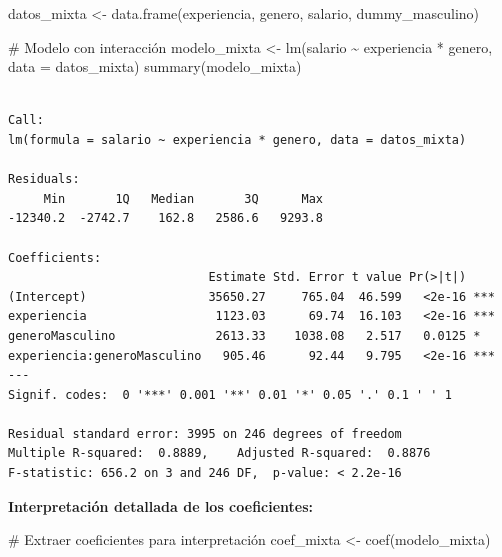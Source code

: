 \documentclass[
  letterpaper,
  DIV=11,
  numbers=noendperiod]{scrreprt}
\newenvironment{Shaded}{\begin{snugshade}}{\end{snugshade}}
\newcommand{\AttributeTok}[1]{\textcolor[rgb]{0.40,0.45,0.13}{#1}}
\newcommand{\CommentTok}[1]{\textcolor[rgb]{0.37,0.37,0.37}{#1}}
\newcommand{\FunctionTok}[1]{\textcolor[rgb]{0.28,0.35,0.67}{#1}}
\newcommand{\NormalTok}[1]{\textcolor[rgb]{0.00,0.23,0.31}{#1}}
\newcommand{\OtherTok}[1]{\textcolor[rgb]{0.00,0.23,0.31}{#1}}
\newcommand{\SpecialCharTok}[1]{\textcolor[rgb]{0.37,0.37,0.37}{#1}}
\begin{document}
\begin{tcolorbox}
\begin{Shaded}
\begin{Highlighting}[]
\NormalTok{datos\_mixta }\OtherTok{\textless{}{-}} \FunctionTok{data.frame}\NormalTok{(experiencia, genero, salario, dummy\_masculino)}

\CommentTok{\# Modelo con interacción}
\NormalTok{modelo\_mixta }\OtherTok{\textless{}{-}} \FunctionTok{lm}\NormalTok{(salario }\SpecialCharTok{\textasciitilde{}}\NormalTok{ experiencia }\SpecialCharTok{*}\NormalTok{ genero, }\AttributeTok{data =}\NormalTok{ datos\_mixta)}
\FunctionTok{summary}\NormalTok{(modelo\_mixta)}
\end{Highlighting}
\end{Shaded}

\begin{verbatim}

Call:
lm(formula = salario ~ experiencia * genero, data = datos_mixta)

Residuals:
     Min       1Q   Median       3Q      Max 
-12340.2  -2742.7    162.8   2586.6   9293.8 

Coefficients:
                            Estimate Std. Error t value Pr(>|t|)    
(Intercept)                 35650.27     765.04  46.599   <2e-16 ***
experiencia                  1123.03      69.74  16.103   <2e-16 ***
generoMasculino              2613.33    1038.08   2.517   0.0125 *  
experiencia:generoMasculino   905.46      92.44   9.795   <2e-16 ***
---
Signif. codes:  0 '***' 0.001 '**' 0.01 '*' 0.05 '.' 0.1 ' ' 1

Residual standard error: 3995 on 246 degrees of freedom
Multiple R-squared:  0.8889,    Adjusted R-squared:  0.8876 
F-statistic: 656.2 on 3 and 246 DF,  p-value: < 2.2e-16
\end{verbatim}

\textbf{Interpretación detallada de los coeficientes:}

\begin{Shaded}
\begin{Highlighting}[]
\CommentTok{\# Extraer coeficientes para interpretación}
\NormalTok{coef\_mixta }\OtherTok{\textless{}{-}} \FunctionTok{coef}\NormalTok{(modelo\_mixta)}


\end{Highlighting}
\end{Shaded}
\end{tcolorbox}
\end{document}
